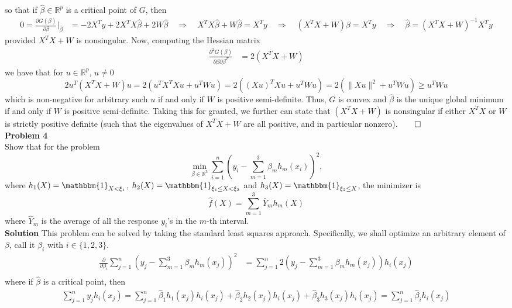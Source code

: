 \documentclass[10pt]{article}
\newcommand{\bp}[1]{\left({#1}\right)}
\newcommand{\mbb}[1]{\mathbb{#1}}
\newcommand{\1}[1]{\mathbbm{1}_{#1}}
\begin{document}
    so that if $\hat{\beta}\in\mbb{R}^p$ is a critical point of $G$, then
    \begin{align*}
        0=\frac{\partial G(\beta)}{\partial\beta}\bigg|_{\hat{\beta}}&=-2X^Ty+2X^TX\hat{\beta}+2W\hat{\beta}\quad\Rightarrow\quad X^TX\hat{\beta}+W\hat{\beta}=X^Ty\quad\Rightarrow\quad(X^TX+W)\hat{\beta}=X^Ty\quad\Rightarrow\quad\hat{\beta}=(X^TX+W)^{-1}X^Ty
    \end{align*}
    provided $X^TX+W$ is nonsingular. Now, computing the Hessian matrix
    \begin{align*}
        \frac{\partial^2G(\beta)}{\partial\beta\partial\beta^T}&=2(X^TX+W)
    \end{align*}
    we have that for $u\in\mbb{R}^p$, $u\neq 0$
    \[2u^T(X^TX+W)u=2(u^TX^TXu+u^TWu)=2((Xu)^TXu+u^TWu)=2(\|Xu\|^2+u^TWu)\geq u^TWu\]
    which is non-negative for arbitrary such $u$ if and only if $W$ is positive semi-definite. Thus, $G$ is convex and $\hat{\beta}$ is the unique global minimum if and only if $W$ is positive semi-definite.
    Taking this for granted, we further can state that $(X^TX+W)$ is nonsingular if either $X^TX$ or $W$ is strictly positive definite (such that the eigenvalues of $X^TX+W$ are all positive, and in particular nonzero).\hfill{$\qed$}\\[5pt]
    {\bf Problem 4}\\[5pt]
    Show that for the problem 
    \[\min_{\beta\in\mbb{R}^3}\sum_{i=1}^n\bp{y_i-\sum_{m=1}^3\beta_mh_m(x_i)}^2,\]
    where $h_1(X)=\1{X<\xi_1}$, $h_2(X)=\1{\xi_1\leq X<\xi_2}$ and $h_3(X)=\1{\xi_2\leq X}$, the minimizer is
    \[\hat{f}(X)=\sum_{m=1}^3\bar{Y}_mh_m(X)\]
    where $\hat{Y}_m$ is the average of all the response $y_i$'s in the $m$-th interval.\\[5pt]
    {\bf Solution}\hspace{5pt} This problem can be solved by taking the standard least squares approach. Specifically, we shall optimize an arbitrary element of $\beta$, call it
    $\beta_i$ with $i\in\{1,2,3\}$.
    \begin{align*}
        \frac{\partial}{\partial\beta_i}\sum_{j=1}^n\bp{y_j-\sum_{m=1}^3\beta_mh_m(x_j)}^2&=\sum_{j=1}^n2\bp{y_j-\sum_{m=1}^3\beta_mh_m(x_j)}h_{i}(x_j)\\
    \end{align*} 
    where if $\hat{\beta}$ is a critical point, then
    \begin{align*}
        \sum_{j=1}^ny_jh_i(x_j)=\sum_{j=1}^n\hat{\beta}_1h_1(x_j)h_i(x_j)+\hat{\beta}_2h_2(x_j)h_i(x_j)+\hat{\beta}_3h_3(x_j)h_i(x_j)=\sum_{j=1}^n\hat{\beta}_ih_i(x_j)
    \end{align*}
\end{document}
